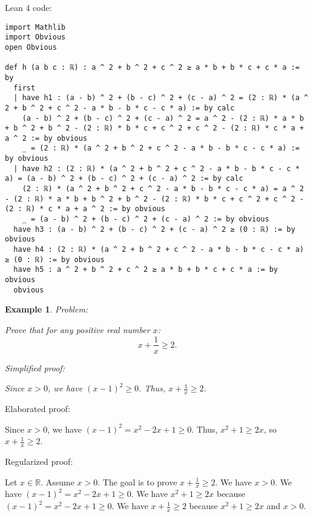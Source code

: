 \documentclass{article}
\newtheorem{example}{Example}
\begin{document}
Lean 4 code:
\begin{tcolorbox}[colback=white!10, width=\linewidth]
\begin{lstlisting}[language=Lean4]
import Mathlib
import Obvious
open Obvious

def h (a b c : ℝ) : a ^ 2 + b ^ 2 + c ^ 2 ≥ a * b + b * c + c * a := by
  first
  | have h1 : (a - b) ^ 2 + (b - c) ^ 2 + (c - a) ^ 2 = (2 : ℝ) * (a ^ 2 + b ^ 2 + c ^ 2 - a * b - b * c - c * a) := by calc
    (a - b) ^ 2 + (b - c) ^ 2 + (c - a) ^ 2 = a ^ 2 - (2 : ℝ) * a * b + b ^ 2 + b ^ 2 - (2 : ℝ) * b * c + c ^ 2 + c ^ 2 - (2 : ℝ) * c * a + a ^ 2 := by obvious
    _ = (2 : ℝ) * (a ^ 2 + b ^ 2 + c ^ 2 - a * b - b * c - c * a) := by obvious
  | have h2 : (2 : ℝ) * (a ^ 2 + b ^ 2 + c ^ 2 - a * b - b * c - c * a) = (a - b) ^ 2 + (b - c) ^ 2 + (c - a) ^ 2 := by calc
    (2 : ℝ) * (a ^ 2 + b ^ 2 + c ^ 2 - a * b - b * c - c * a) = a ^ 2 - (2 : ℝ) * a * b + b ^ 2 + b ^ 2 - (2 : ℝ) * b * c + c ^ 2 + c ^ 2 - (2 : ℝ) * c * a + a ^ 2 := by obvious
    _ = (a - b) ^ 2 + (b - c) ^ 2 + (c - a) ^ 2 := by obvious
  have h3 : (a - b) ^ 2 + (b - c) ^ 2 + (c - a) ^ 2 ≥ (0 : ℝ) := by obvious
  have h4 : (2 : ℝ) * (a ^ 2 + b ^ 2 + c ^ 2 - a * b - b * c - c * a) ≥ (0 : ℝ) := by obvious
  have h5 : a ^ 2 + b ^ 2 + c ^ 2 ≥ a * b + b * c + c * a := by obvious
  obvious

\end{lstlisting}
\end{tcolorbox}


\begin{example}
Problem:
\begin{tcolorbox}[colback=yellow!10, width=\linewidth]
Prove that for any positive real number $x$:
    $$x + \frac{1}{x} \geq 2.$$
\end{tcolorbox}

Simplified proof:
\begin{tcolorbox}[colback=blue!10, width=\linewidth]
Since $x>0$, we have $(x-1)^2 \ge 0$. Thus, $x + \frac{1}{x} \ge 2$.
\end{tcolorbox}
\end{example}

Elaborated proof:
\begin{tcolorbox}[colback=green!10, width=\linewidth]
Since $x>0$, we have $(x-1)^2 = x^2 - 2x + 1 \ge 0$. Thus, $x^2 + 1 \ge 2x$, so $x + \frac{1}{x} \ge 2$.
\end{tcolorbox}

Regularized proof:
\begin{tcolorbox}[colback=red!10, width=\linewidth]
Let $x\in\mathbb{R}$.
Assume $x > 0$.
The goal is to prove $x + \frac{1}{x} \ge 2$.
We have $x>0$.
We have ${(x-1)}^2 = x^2 - 2x + 1 \ge 0$.
We have $x^2 + 1 \ge 2x$ because ${(x-1)}^2 = x^2 - 2x + 1 \ge 0$.
We have $x + \frac{1}{x} \ge 2$ because $x^2 + 1 \ge 2x$ and $x>0$.
\end{tcolorbox}
\end{document}
